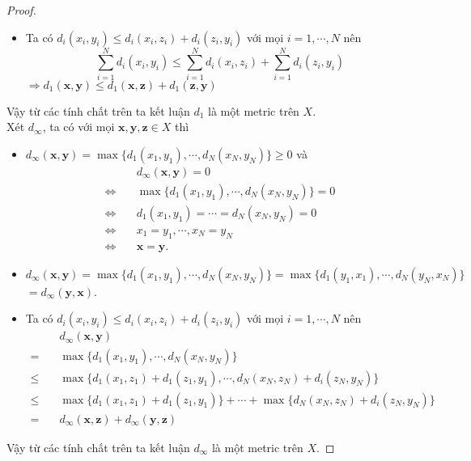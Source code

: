 \begin{proof}
\begin{itemize}
    \item Ta có $d_i(x_i,y_i) \leq d_i(x_i,z_i) + d_i(z_i,y_i)$ với mọi $i = 1,\cdots,N$ nên
    $$
        \sum_{i=1}^N d_i(x_i,y_i) \leq \sum_{i=1}^N d_i(x_i,z_i) + \sum_{i=1}^N d_i(z_i,y_i)
    $$
    $\Rightarrow d_1(\mathbf{x}, \mathbf{y}) \leq d_1(\mathbf{x}, \mathbf{z}) + d_1(\mathbf{z}, \mathbf{y})$
\end{itemize}
Vậy từ các tính chất trên ta kết luận $d_1$ là một metric trên $X$.\QEDFill\\[3mm]
Xét $d_{\infty}$, ta có với mọi $\mathbf{x}, \mathbf{y}, \mathbf{z} \in X$ thì
\begin{itemize}
    \item $d_{\infty}(\mathbf{x}, \mathbf{y}) = \max\{d_1(x_1,y_1), \cdots, d_N(x_N,y_N)\} \geq 0$ và
    \begin{align*}
        &\quad d_{\infty}(\mathbf{x}, \mathbf{y}) = 0\\
        \Leftrightarrow&\quad \max\{d_1(x_1,y_1), \cdots, d_N(x_N,y_N)\} = 0\\
        \Leftrightarrow&\quad d_1(x_1,y_1) = \cdots = d_N(x_N,y_N) = 0\\
        \Leftrightarrow&\quad x_1 = y_1, \cdots, x_N = y_N\\
        \Leftrightarrow&\quad \mathbf{x} = \mathbf{y}.
    \end{align*}
    \item $d_{\infty}(\mathbf{x}, \mathbf{y}) = \max\{d_1(x_1,y_1), \cdots, d_N(x_N,y_N)\} = \max\{d_1(y_1,x_1), \cdots, d_N(y_N,x_N)\}$\\
    $= d_{\infty}(\mathbf{y}, \mathbf{x})$.
    \item Ta có $d_i(x_i,y_i) \leq d_i(x_i,z_i) + d_i(z_i,y_i)$ với mọi $i = 1,\cdots,N$ nên
    \begin{align*}
        &\quad d_{\infty}(\mathbf{x},\mathbf{y})\\
        =&\quad \max\{d_1(x_1,y_1), \cdots, d_N(x_N,y_N)\}\\
        \leq&\quad \max\{d_1(x_1,z_1) + d_1(z_1,y_1), \cdots, d_N(x_N,z_N) + d_i(z_N,y_N)\}\\
        \leq&\quad \max\{d_1(x_1,z_1) + d_1(z_1,y_1)\} + \cdots + \max\{d_N(x_N,z_N) + d_i(z_N,y_N)\}\\
        =&\quad d_{\infty}(\mathbf{x}, \mathbf{z}) + d_{\infty}(\mathbf{y}, \mathbf{z})
    \end{align*}
\end{itemize}
Vậy từ các tính chất trên ta kết luận $d_{\infty}$ là một metric trên $X$.
\end{proof}

